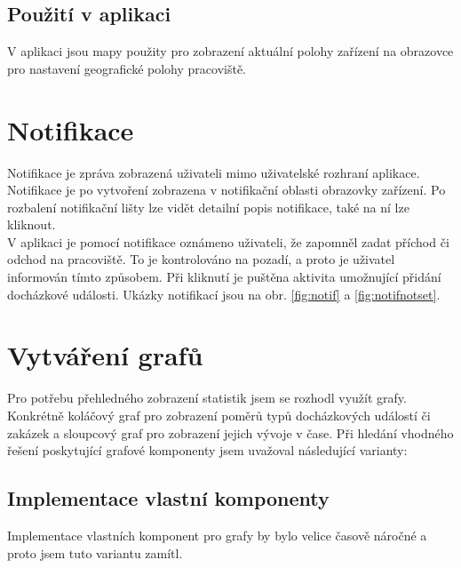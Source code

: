 \documentclass{diplomka}
\begin{document}
\subsection*{Použití v aplikaci}
V aplikaci jsou mapy použity pro zobrazení aktuální polohy zařízení na obrazovce pro nastavení geografické polohy pracoviště.

\section{Notifikace}
Notifikace je zpráva zobrazená uživateli mimo uživatelské rozhraní aplikace. Notifikace je po vytvoření zobrazena v notifikační oblasti obrazovky zařízení. Po rozbalení notifikační lišty lze vidět detailní popis notifikace, také na ní lze kliknout.
\\ \indent
V aplikaci je pomocí notifikace oznámeno uživateli, že zapomněl zadat příchod či odchod na pracoviště. To je kontrolováno na pozadí, a proto je uživatel informován tímto způsobem. Při kliknutí je puštěna aktivita umožnující přidání docházkové události.
Ukázky notifikací jsou na obr. \ref{fig:notif} a \ref{fig:notifnotset}.

\section{Vytváření grafů}
Pro potřebu přehledného zobrazení statistik jsem se rozhodl využít grafy. Konkrétně koláčový graf pro zobrazení poměrů typů docházkových událostí či zakázek a sloupcový graf pro zobrazení jejich vývoje v čase. Při hledání vhodného řešení poskytující grafové komponenty jsem uvažoval následující varianty:

\subsection{Implementace vlastní komponenty}
Implementace vlastních komponent pro grafy by bylo velice časově náročné a proto jsem tuto variantu zamítl.
\end{document}
